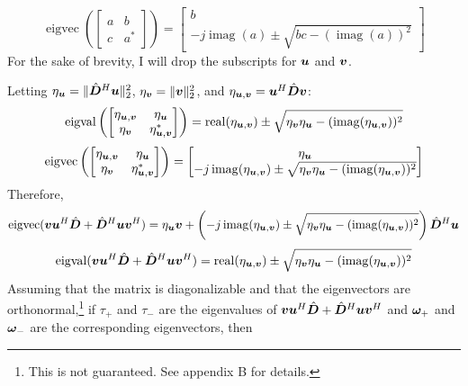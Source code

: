 %
\begin{equation}
\operatorname{eigvec}\left(\begin{bmatrix} a & b \\ c & a^* \end{bmatrix}\right) = \begin{bmatrix} b \\ -j\operatorname{imag}(a) \pm \sqrt{bc - (\operatorname{imag}(a))^2}\end{bmatrix}
\end{equation}
%
For the sake of brevity, I will drop the subscripts for $\bm{u}$ and $\bm{v}$.

Letting $\eta_{\bm{u}} = \|\hat{\bm{D}}^H\bm{u}\|_2^2$, $\eta_{\bm{v}} = \|\bm{v}\|_2^2$, and $\eta_{\bm{u},\bm{v}} = \bm{u}^H\hat{\bm{D}}\bm{v}$:
%
\begin{equation}
\operatorname{eigval}\left(\begin{bmatrix}
\eta_{\bm{u},\bm{v}} & \eta_{\bm{u}} \\
\eta_{\bm{v}}    & \eta_{\bm{u},\bm{v}}^*
\end{bmatrix}\right)
= \operatorname{real}(\eta_{\bm{u},\bm{v}}) \pm \sqrt{\eta_{\bm{v}}\eta_{\bm{u}} - (\operatorname{imag}(\eta_{\bm{u},\bm{v}}))^2}
\end{equation}
%
\begin{equation}
\operatorname{eigvec}
\left(\begin{bmatrix}
\eta_{\bm{u},\bm{v}} & \eta_{\bm{u}} \\
\eta_{\bm{v}}    & \eta_{\bm{u},\bm{v}}^*
\end{bmatrix}\right)
= \begin{bmatrix}
\eta_{\bm{u}} \\
-j\operatorname{imag}(\eta_{\bm{u},\bm{v}}) \pm \sqrt{\eta_{\bm{v}}\eta_{\bm{u}} - (\operatorname{imag}(\eta_{\bm{u},\bm{v}}))^2}
\end{bmatrix}
\end{equation}
%
%
%
Therefore, 
%
\begin{equation}
\operatorname{eigvec}
(
\bm{v}\bm{u}^H\hat{\bm{D}} + \hat{\bm{D}}^H\bm{u}\bm{v}^H
) = 
\eta_{\bm{u}}\bm{v} +
\left(-j\operatorname{imag}(\eta_{\bm{u},\bm{v}}) \pm \sqrt{\eta_{\bm{v}} \eta_{\bm{u}} - (\operatorname{imag}(\eta_{\bm{u},\bm{v}}))^2}\right)\hat{\bm{D}}^H\bm{u}
\end{equation}
%
%
\begin{equation}
\operatorname{eigval}(
\bm{v}\bm{u}^H\hat{\bm{D}} + \hat{\bm{D}}^H\bm{u}\bm{v}^H
)
= \operatorname{real}(\eta_{\bm{u},\bm{v}}) \pm \sqrt{\eta_{\bm{v}}\eta_{\bm{u}} - (\operatorname{imag}(\eta_{\bm{u},\bm{v}}))^2}
\end{equation}
%
Assuming that the matrix is diagonalizable and that the eigenvectors are orthonormal,\footnote{This is not guaranteed. See appendix B for details.} if $\tau_+$ and $\tau_-$ are the eigenvalues of $\bm{v}\bm{u}^H\hat{\bm{D}} + \hat{\bm{D}}^H\bm{u}\bm{v}^H$ and $\bm{\omega}_+$ and $\bm{\omega}_-$ are the corresponding eigenvectors, then 
